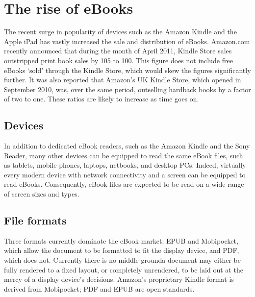 \chapter{The rise of eBooks} \label{ch:intro} %
The recent surge in popularity of devices such as the Amazon Kindle and the Apple iPad has vastly
increased the sale and distribution of eBooks. Amazon.com recently announced\cite{Amazon.com2011}
that during the month of April 2011, Kindle Store sales outstripped print book sales by 105 to 100.
This figure does not include free eBooks `sold' through the Kindle Store, which would skew the
figures significantly further. It was also reported that Amazon's UK Kindle Store, which opened in
September 2010, was, over the same period, outselling hardback books by a factor of two to one.
These ratios are likely to increase as time goes on.

\section{Devices}
In addition to dedicated eBook readers, such as the Amazon Kindle and the Sony Reader, many other
devices can be equipped to read the same eBook files, such as tablets, mobile phones, laptops,
netbooks, and desktop PCs. Indeed, virtually every modern device with network connectivity and a
screen can be equipped to read eBooks. Consequently, eBook files are expected to be read on a wide
range of screen sizes and types.


\section{File formats}
Three formats currently dominate the eBook market: EPUB and Mobipocket, which allow the document to
be formatted to fit the display device, and PDF, which does not. Currently there is no middle
ground\ed a document may either be fully rendered to a fixed layout, or completely unrendered, to be
laid out at the mercy of a display device's decisions. Amazon's proprietary Kindle format is derived
from Mobipocket; PDF and EPUB are open standards.


